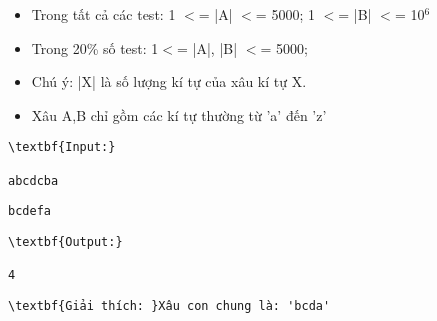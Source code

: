 \begin{itemize}
	\item Trong tất cả các test: 1 $<$= |A| $<$= 5000; 1 $<$= |B| $<$= 10$^6$
	\item Trong 20\% số test: 1$<$= |A|, |B| $<$= 5000;
	\item Chú ý: |X| là số lượng kí tự của xâu kí tự X.
	\item Xâu A,B chỉ gồm các kí tự thường từ 'a' đến 'z'
\end{itemize}
\begin{verbatim}
\textbf{Input:}

abcdcba\end{verbatim}
\begin{verbatim}
bcdefa\end{verbatim}
\begin{verbatim}
\textbf{Output:}

4\end{verbatim}
\begin{verbatim}
\textbf{Giải thích: }Xâu con chung là: 'bcda'\end{verbatim}